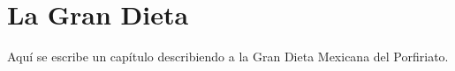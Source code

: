 \chapter{La Gran Dieta}
\label{chapter:GranDieta}

Aquí se escribe un capítulo describiendo a la Gran Dieta Mexicana del Porfiriato.